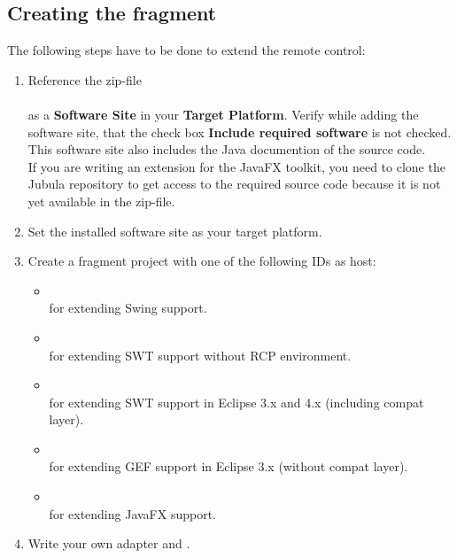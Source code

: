 \subsection{Creating the fragment}

The following steps have to be done to extend the remote control:

\begin{enumerate}
  \item Reference the zip-file\\
        \\
        as a \textbf{Software Site} in your \textbf{Target Platform}.
        Verify while adding the software site, that the check box
        \textbf{Include required software} is not checked. This software site also
        includes the Java documention of the source code.\\
	If you are writing an extension for the JavaFX toolkit, you need to clone
	the Jubula repository to get access to the required source code because it
	is not yet available in the zip-file.
  \item Set the installed software site as your target platform.
  \item Create a fragment project with one of the following IDs as host:
    \begin{itemize}
      \item {}\\
            for extending Swing support.
      \item {}\\
            for extending SWT support without RCP environment.
      \item {}\\
            for extending SWT support in Eclipse 3.x and 4.x (including compat
            layer).
      \item {}\\
            for extending GEF support in Eclipse 3.x (without compat
            layer).
      \item {}\\
            for extending JavaFX support.
   \end{itemize}
  \item Write your own adapter and \gdtesterclasses.
\end{enumerate}

